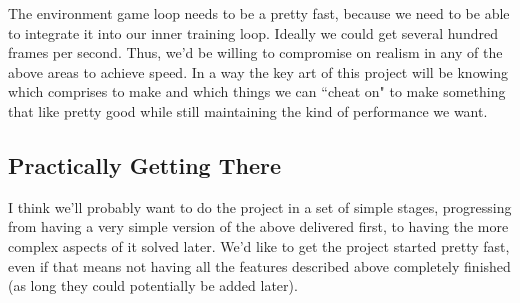 \documentclass[12pt]{article}
\begin{document}
The environment game loop needs to be a pretty fast, because we need to be able to integrate it into our inner training loop.  Ideally we could get several hundred frames per second.   Thus, we'd be willing to compromise on realism in any of the above areas to achieve speed.   In a way the key art of this project will be knowing which comprises to make and which things we can ``cheat on" to make something that like pretty good while still maintaining the kind of performance we want. 


\subsection*{Practically Getting There}

I think we'll probably want to do the project in a set of simple stages, progressing from having a very simple version of the above delivered first, to having the more complex aspects of it solved later.  We'd like to get the project started pretty fast, even if that means not having all the features described above completely finished (as long they could potentially be added later). 
\end{document}

